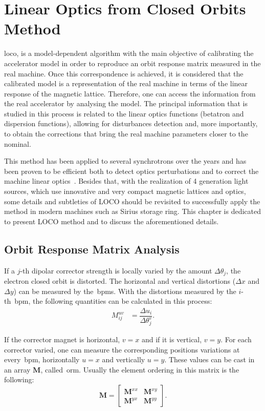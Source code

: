\chapter{Linear Optics from Closed Orbits Method}\label{chap:loco}
\gls{loco}, is a model-dependent algorithm with the main objective of calibrating the accelerator model in order to reproduce an orbit response matrix measured in the real machine. Once this correspondence is achieved, it is considered that the calibrated model is a representation of the real machine in terms of the linear response of the magnetic lattice. Therefore, one can access the information from the real accelerator by analysing the model. The principal information that is studied in this process is related to the linear optics functions (betatron and dispersion functions), allowing for disturbances detection and, more importantly, to obtain the corrections that bring the real machine parameters closer to the nominal.

This method has been applied to several synchrotrons over the years and has been proven to be efficient both to detect optics perturbations and to correct the machine linear optics~\cite{safranek1997, icfa_laurent, icfa_australia}. Besides that, with the realization of 4 generation light sources, which use innovative and very compact magnetic lattices and optics, some details and subtleties of LOCO should be revisited to successfully apply the method in modern machines such as Sirius storage ring. This chapter is dedicated to present LOCO method and to discuss the aforementioned details.
\section{Orbit Response Matrix Analysis}\label{sec:orm_analysis}
If a $j$-th dipolar corrector strength is locally varied by the amount $\Delta \theta_j$, the electron closed orbit is distorted. The horizontal and vertical distortions ($\Delta x$ and $\Delta y$) can be measured by the~\gls{bpm}s. With the distortions measured by the $i$-th~\gls{bpm}, the following quantities can be calculated in this process:
\begin{align}
    M^{uv}_{ij} &= \dfrac{\Delta u_i}{\Delta \theta_j^v}.
\end{align}

If the corrector magnet is horizontal, $v=x$ and if it is vertical, $v=y$. For each corrector varied, one can measure the corresponding positions variations at every~\gls{bpm}, horizontally $u=x$ and vertically $u=y$. These values can be cast in an array $\mathbf{M}$, called~\gls{orm}. Usually the element ordering in this matrix is the following:
\begin{equation}
    \mathbf{M} = \begin{bmatrix}
    \mathbf{M}^{xx} & \mathbf{M}^{xy} \\
    \mathbf{M}^{yx} & \mathbf{M}^{yy} 
\end{bmatrix}.
\end{equation}

